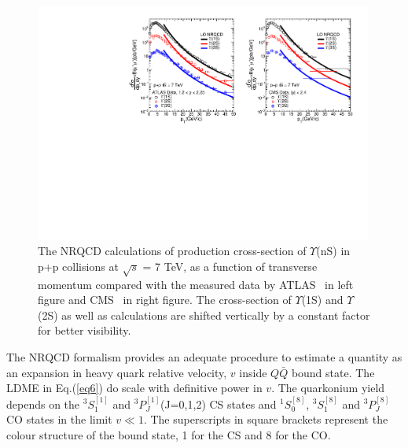 \begin{figure}
  \centering
  \includegraphics[width=0.99\textwidth]{Figures/NRQCD_Beauty/Fig_CMS_ATLAS_YnS_7TeV_Pt.pdf}
  \caption{\small{The NRQCD calculations of production cross-section of $\Upsilon$(nS) in
      p+p collisions at $\sqrt{s}$ = 7 TeV, as a function of transverse momentum compared with
      the measured data by ATLAS~\cite{Aad:2012dlq} in left figure and CMS~\cite{Chatrchyan:2013yna}
      in right figure. The cross-section of $\Upsilon$(1S) and $\Upsilon$(2S) as well as
      calculations are shifted vertically by a constant factor for better visibility.}}
  \label{Fig:SigmaYnSCMS7TeV}
\end{figure}



The NRQCD formalism provides an adequate procedure to estimate a quantity as an expansion in 
heavy quark relative velocity, $v$ inside $Q\bar{Q}$ bound state. The LDME in Eq.(\ref{eq6})
do scale with definitive power in $v$. The quarkonium yield depends on the $^3S_1^{[1]}$ 
and $^3P_J^{[1]}$(J=0,1,2) CS states and $^1S_0^{[8]}$, $^3S_1^{[8]}$ and $^3P_J^{[8]}$
CO states in the limit $v\ll 1$.
The superscripts in square brackets represent the colour structure of the bound state,
1 for the CS and 8 for the CO.





